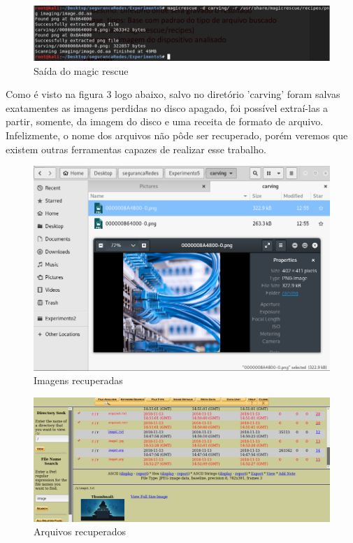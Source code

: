 \documentclass[journal]{IEEEtran}
\begin{document}
\begin{figure}[h!]
	\includegraphics[width=\linewidth]{../pictures/carving/carving_output.png}
	\caption{Saída do magic rescue}
	\label{fig:magicrescue_carving}
\end{figure}

Como é visto na figura 3 logo abaixo, salvo no diretório 'carving' foram salvas exatamentes as imagens perdidas no disco apagado, foi possível extraí-las a partir, somente, da imagem do disco e uma receita de formato de arquivo. Infelizmente, o nome dos arquivos não pôde ser recuperado, porém veremos que existem outras ferramentas capazes de realizar esse trabalho.

\begin{figure}[h!]
	\includegraphics[width=\linewidth]{../pictures/carving/found_carved_images.png}
	\caption{Imagens recuperadas}
	\label{fig:carved_images}
\end{figure}

\begin{figure}[p!t]
	\includegraphics[width=\linewidth]{../pictures/autopsy/image_txt2.png}
	\caption{Arquivos recuperados}
	\label{fig:carved_files}
\end{figure}
\end{document}
